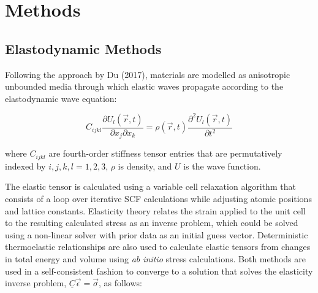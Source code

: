 \section{Methods}


\subsection{Elastodynamic Methods}
Following the approach by Du (2017), materials are modelled as anisotropic unbounded media through which elastic waves propagate according to the elastodynamic wave equation:

\begin{equation}
    C_{ijkl} \frac{\partial U_l(\vec{r},t)}{\partial x_j\partial x_k}= \rho(\vec{r},t)\frac{\partial^2 U_l(\vec{r},t)}{\partial t^2}
    \label{eqn:ewe}
\end{equation}

where $C_{ijkl}$ are fourth-order stiffness tensor entries that are permutatively indexed by $i,j,k,l=1,2,3$, $\rho$ is density, and $U$ is the wave function.

The elastic tensor is calculated using a variable cell relaxation algorithm that consists of a loop over iterative SCF calculations while adjusting atomic positions and lattice constants. Elasticity theory relates the strain applied to the unit cell to the resulting calculated stress as an inverse problem, which could be solved using a non-linear solver with prior data as an initial guess vector. Deterministic thermoelastic relationships are also used to calculate elastic tensors from changes in total energy and volume using \textit{ab initio} stress calculations. Both methods are used in a self-consistent fashion to converge to a solution that solves the elasticity inverse problem, $\underline{C}\vec{\epsilon} = \vec{\sigma}$, as follows: \cite{timoshenko1951theory, mit1620}



